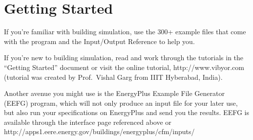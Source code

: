 \section{Getting Started}\label{getting-started}

If you're familiar with building simulation, use the 300+ example files that come with the program and the Input/Output Reference to help you.

If you're new to building simulation, read and work through the tutorials in the ``Getting Started'' document or visit the online tutorial, http://www.vibyor.com (tutorial was created by Prof.~Vishal Garg from IIIT Hyberabad, India).

Another avenue you might use is the EnergyPlus Example File Generator (EEFG) program, which will not only produce an input file for your later use, but also run your specifications on EnergyPlus and send you the results. EEFG is available through the interface page referenced above or http://apps1.eere.energy.gov/buildings/energyplus/cfm/inputs/
